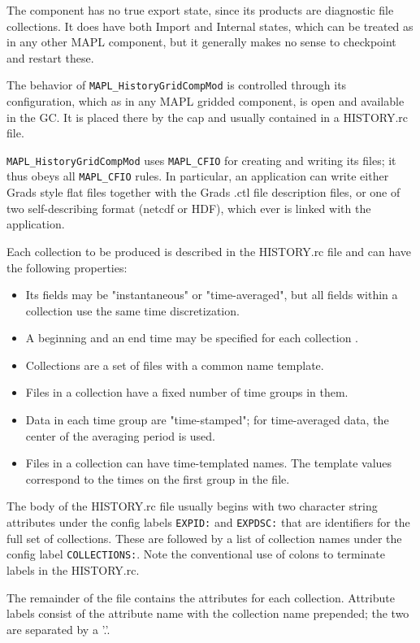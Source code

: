    The component has no true export state, since its products are diagnostic
   file collections. It does have both Import and Internal states, which can be treated as
   in any other MAPL component, but it generally makes no sense to checkpoint and restart
   these.
 
   The behavior of  {\tt MAPL\_HistoryGridCompMod} is controlled through its configuration,
   which as in any MAPL gridded component, is open and available in the GC. It is placed
   there by the cap and usually contained in a HISTORY.rc file.

   {\tt MAPL\_HistoryGridCompMod} uses {\tt MAPL\_CFIO} for creating and writing its files;
   it thus obeys all {\tt MAPL\_CFIO} rules. In particular, an application can write either
   Grads style flat files together with the Grads .ctl file description files, or
   one of two self-describing format (netcdf or HDF), which ever is linked with the 
   application.

   Each collection  to be produced is described in the HISTORY.rc file and can have the
   following properties:

 \begin{itemize}
 \item Its fields may be "instantaneous" or "time-averaged", but all fields within
       a collection use the same time discretization. 
 \item A beginning and an end time may be specified for each collection .
 \item Collections are a set of files with a common name template. 
 \item Files in a collection have a fixed number of time groups in them.
 \item Data in each time group are "time-stamped"; for time-averaged data,
  the center of the averaging period is used.
 \item Files in a collection can have time-templated names. The template
       values correspond to the times on the first group in the file.
 \end{itemize}

 The body of the HISTORY.rc file usually begins with two
 character string attributes under the config labels {\tt EXPID:} and {\tt EXPDSC:}
 that are identifiers for the full set of collections. These are followed
 by a list of collection names under the config label {\tt COLLECTIONS:}. Note
 the conventional use of colons to terminate labels in the HISTORY.rc.
 
 The remainder of the file contains the attributes for each collection.
 Attribute labels consist of the attribute name with the collection name
 prepended; the two are separated by a '.'.

